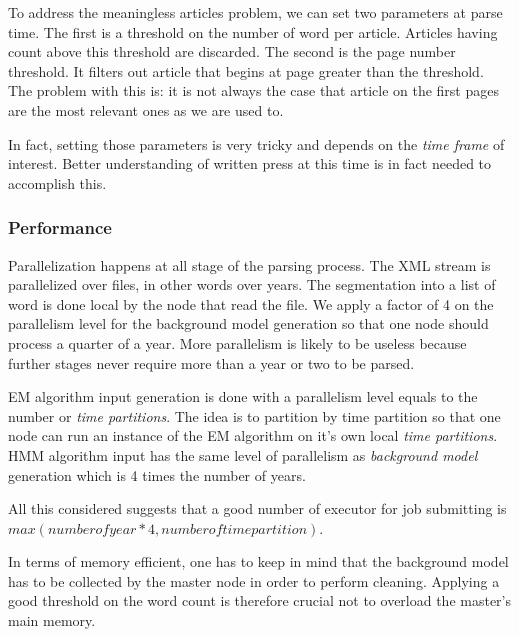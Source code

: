 To address the meaningless articles problem, we can set two parameters at parse time. The first is a threshold on the number of word per article. Articles having count above this threshold are discarded. The second is the page number threshold. It filters out article that begins at page greater than the threshold. The problem with this is: it is not always the case that article on the first pages are the most relevant ones as we are used to.

In fact, setting those parameters is very tricky and depends on the \emph{time frame} of interest. Better understanding of written press at this time is in fact needed to accomplish this.

\subsubsection{Performance}

Parallelization happens at all stage of the parsing process. The XML stream is parallelized over files, in other words over years. The segmentation into a list of word is done local by the node that read the file. We apply a factor of 4 on the parallelism level for the background model generation so that one node should process a quarter of a year. More parallelism is likely to be useless because further stages never require more than a year or two to be parsed.

EM algorithm input generation is done with a parallelism level equals to the number or \emph{time partitions}. The idea is to partition by time partition so that one node can run an instance of the EM algorithm on it's own local  \emph{time partitions}. HMM algorithm input has the same level of parallelism as \emph{background model} generation which is 4 times the number of years. 

All this considered suggests that a good number of executor for job submitting is $max(number of year*4, number of time partition)$.

In terms of memory efficient, one has to keep in mind that the background model has to be collected by the master node in order to perform cleaning. Applying a good threshold on the word count is therefore crucial not to overload the master's main memory.



